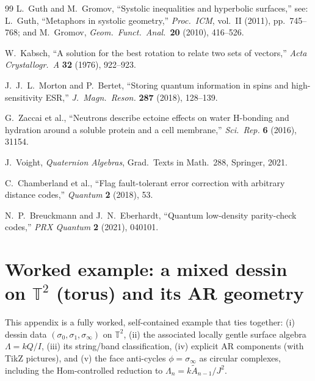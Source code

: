 \documentclass[11pt,oneside]{amsbook}
\numberwithin{equation}{section}
\theoremstyle{plain}
\theoremstyle{definition}
\theoremstyle{remark}
\begin{document}
\begin{thebibliography}{99}
L.~Guth and M.~Gromov,
\newblock ``Systolic inequalities and hyperbolic surfaces,''
\newblock see: L.~Guth, ``Metaphors in systolic geometry,'' \emph{Proc.\ ICM}, vol.~II
  (2011), pp.~745--768; and M.~Gromov, \emph{Geom.\ Funct.\ Anal.}\ \textbf{20} (2010), 416--526.

W.~Kabsch,
\newblock ``A solution for the best rotation to relate two sets of vectors,''
\newblock \emph{Acta Crystallogr.\ A} \textbf{32} (1976), 922--923.

J.~J.~L.~Morton and P.~Bertet,
\newblock ``Storing quantum information in spins and high-sensitivity ESR,''
\newblock \emph{J.\ Magn.\ Reson.} \textbf{287} (2018), 128--139.

G.~Zaccai et al.,
\newblock ``Neutrons describe ectoine effects on water H-bonding and hydration around
  a soluble protein and a cell membrane,''
\newblock \emph{Sci.\ Rep.} \textbf{6} (2016), 31154.

J.~Voight,
\newblock \emph{Quaternion Algebras}, Grad.\ Texts in Math.\ 288, Springer, 2021.

C.~Chamberland et al.,
\newblock ``Flag fault-tolerant error correction with arbitrary distance codes,''
\newblock \emph{Quantum} \textbf{2} (2018), 53.

N.~P.~Breuckmann and J.~N.~Eberhardt,
\newblock ``Quantum low-density parity-check codes,''
\newblock \emph{PRX Quantum} \textbf{2} (2021), 040101.

\end{thebibliography}

\backmatter
\appendix

\chapter{Worked example: a mixed dessin on $\mathbb T^2$ (torus) and its AR geometry}
\label{app:torus_dessin}

This appendix is a fully worked, self-contained example that ties together:
(i) dessin data $(\sigma_0,\sigma_1,\sigma_\infty)$ on $\mathbb T^2$,
(ii) the associated locally gentle surface algebra $\Lambda=kQ/I$,
(iii) its string/band classification,
(iv) explicit AR components (with TikZ pictures),
and (v) the face anti-cycles $\phi=\sigma_\infty$ as circular complexes, including the Hom-controlled reduction to
$\Lambda_n=k\widetilde A_{n-1}/J^2$.
\end{document}
